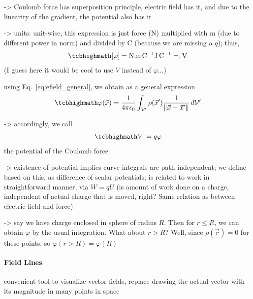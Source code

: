 \documentclass[../class_mech_main.tex]{subfiles}
\DeclareMathOperator{\fpeps}{\frac{1}{4 \pi \epsilon_0}}
\begin{document}
-> Coulomb force has superposition principle, electric field has it, and due to the linearity of the gradient, the potential also has it

-> units: unit-wise, this expression is just force ($\unit{\newton}$) multiplied with $\unit{\meter}$ (due to different power in norm) and divided by $\unit{\coulomb}$ (because we are missing a $q$); thus,
\begin{equation}
    \eqbox{
        \qty[\varphi] = \unit{\newton \meter \per \coulomb} \unit{\joule \per \coulomb} \eqqcolon \unit{\volt}
    }
\end{equation}
(I guess here it would be cool to use $V$ instead of $\varphi$...)


using Eq.~\eqref{eq:efield_general}, we obtain as a general expression
\begin{equation}
    \eqbox{
        \varphi(\vec{x}) = \fpeps \int_{\mathcal{V}'} \rho(\vec{x}') \frac{1}{\norm{\vec{x} - \vec{x}'}} \, d\mathcal{V}'
    }
\end{equation}

-> accordingly, we call
\begin{equation}
    \eqbox{
        V \coloneqq q \varphi
    }
\end{equation}
the potential of the Coulomb force

-> existence of potential implies curve-integrals are path-independent; we define  based on this, as difference of scalar potentials; is related to work in straightforward manner, via $W = q U$ (is amount of work done on a charge, independent of actual charge that is moved, right? Same relation as between electric field and force)


-> say we have charge enclosed in sphere of radius $R$. Then for $r \leq R$, we can obtain $\varphi$ by the usual integration. What about $r > R$? Well, since $\rho(\vec{r}) = 0$ for these points, so $\varphi(r > R) = \varphi(R)$ 



            \paragraph{Field Lines}
convenient tool to visualize vector fields, replace drawing the actual vector with its magnitude in many points in space
\end{document}
